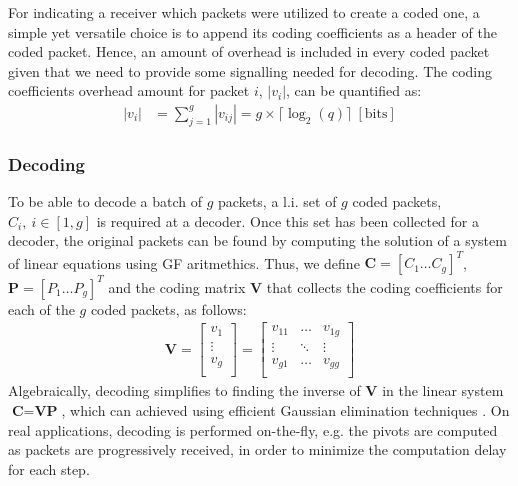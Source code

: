 For indicating a receiver which packets were utilized
to create a coded one, a simple yet versatile choice is to append
its coding coefficients as a header of the coded packet. Hence, an
amount of overhead is included in every coded packet given that we
need to provide some signalling needed for decoding. The coding
coefficients overhead amount for packet $i$, $|v_i|$, can be quantified
as:
%
\begin{align} \label{eq:coded_packet_coef}
|v_i| &= \sum_{j=1}^{g} |v_{ij}| = g \times \lceil \log_{2} (q)
\rceil ~ [\mathrm{bits}]
\end{align}

\subsubsection{Decoding}
\label{sssec:decoding}
To be able to decode a batch of $g$ packets, a \ac{l.i.} set of $g$
coded packets, $C_i,\ i \in [1,g]$ is required at a decoder.
Once this set has been collected for a decoder,
the original packets can be found by computing the solution of a system
of linear equations using \ac{GF} aritmethics. Thus, we define
$\textbf{C} = \left[C_1 \ldots C_g \right]^T$,
$\textbf{P} = \left[P_1 \ldots P_g \right]^T$ and the coding matrix
$\textbf{V}$ that collects the coding coefficients for each of the $g$
coded packets, as follows:
%
\begin{align} \label{eq:coding_matrix}
\textbf{V} =
\left[
\begin{array}{c}
        v_1    \\ \hline
        \vdots \\ \hline
        v_g    \\
\end{array}
\right]
=
\left[
\begin{array}{ccc}
        v_{11} & \ldots & v_{1g} \\
        \vdots  & \ddots & \vdots  \\
        v_{g1} & \ldots & v_{gg} \\
\end{array}
\right]
\end{align}
%
Algebraically, decoding simplifies to finding the inverse of
$\textbf{V}$ in the linear system
$\textbf{C} = \textbf{V} \textbf{P}$, which can achieved using
efficient Gaussian elimination techniques \cite{fragouli2006network}.
On real applications, decoding is performed on-the-fly, e.g. the pivots are
computed as packets are progressively received, in order to minimize the
computation delay for each step.

